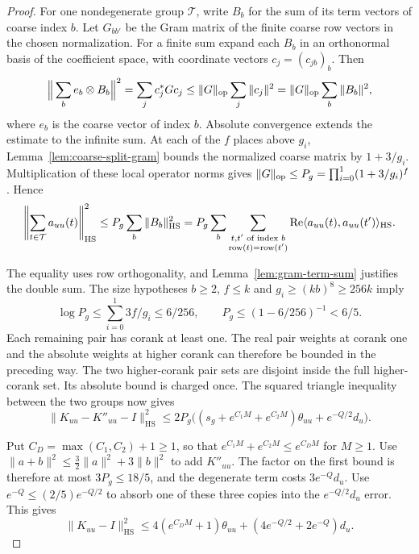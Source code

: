 \begin{proof}
For one nondegenerate group \(\mathcal T\), write \(B_b\)
for the sum of its term vectors of coarse index \(b\).
Let \(G_{bb'}\) be the Gram matrix of the finite coarse row vectors in the chosen normalization. For a finite sum expand each \(B_b\) in an orthonormal basis of the coefficient space, with coordinate vectors \(c_j=(c_{jb})_b\). Then
\[
 \Big\|\sum_b e_b\otimes B_b\Big\|^2
  =\sum_j c_j^*G c_j
  \le \|G\|_{\rm op}\sum_j\|c_j\|^2
  =\|G\|_{\rm op}\sum_b\|B_b\|^2 ,
\]
where \(e_b\) is the coarse vector of index \(b\). Absolute convergence extends the estimate to the infinite sum. At each of the \(f\) places above \(g_i\),
Lemma~\ref{lem:coarse-split-gram} bounds the normalized coarse matrix
by \(1+3/g_i\). Multiplication of these local operator norms gives
\(\|G\|_{\rm op}\le P_g=\prod_{i=0}^1(1+3/g_i)^f\). Hence
\[
 \left\|\sum_{t\in\mathcal T} a_{uu}(t)\right\|_{\rm HS}^2
 \le P_g\sum_b\|B_b\|_{\rm HS}^2
 =P_g\sum_b\sum_{\substack{t,t'\text{ of index }b\\
                            \operatorname{row}(t)=\operatorname{row}(t')}}
      \operatorname{Re}\langle a_{uu}(t),a_{uu}(t')\rangle_{\rm HS}.
\]

The equality uses row orthogonality, and
Lemma~\ref{lem:gram-term-sum} justifies the double sum.
The size hypotheses \(b\ge2\), \(f\le k\) and \(g_i\ge(kb)^8\ge256k\) imply
\[
 \log P_g\le\sum_{i=0}^1 3f/g_i\le6/256,
 \qquad P_g\le(1-6/256)^{-1}<6/5 .
\]
Each remaining pair has corank at least one. The real pair weights at corank one and the absolute weights
at higher corank can therefore be bounded in the preceding way.
The two higher-corank pair sets are disjoint inside the full
higher-corank set. Its absolute bound is charged once. The
squared triangle inequality between the two groups now gives
\[
 \|K_{uu}-K''_{uu}-I\|_{\mathrm{HS}}^2\le
 2P_g\bigl((s_g+e^{C_1M}+e^{C_2M})\theta_{uu}
                      +e^{-Q/2}d_u\bigr).
\]

Put \(C_D=\max(C_1,C_2)+1\ge1\), so that
\(e^{C_1M}+e^{C_2M}\le e^{C_D M}\) for \(M\ge1\).
Use \(\|a+b\|^2\le\tfrac32\|a\|^2+3\|b\|^2\) to add \(K''_{uu}\).
The factor on the first bound is therefore at most \(3P_g\le18/5\),
and the degenerate term costs \(3e^{-Q}d_u\).
Use \(e^{-Q}\le(2/5)e^{-Q/2}\) to absorb one of these three
copies into the \(e^{-Q/2}d_u\) error. This gives
\begin{equation}\label{eq:pretransport-diagonal}
 \|K_{uu}-I\|_{\mathrm{HS}}^2
 \le 4(e^{C_D M}+1)\theta_{uu}
        +(4e^{-Q/2}+2e^{-Q})d_u .
\end{equation}


\end{proof}
